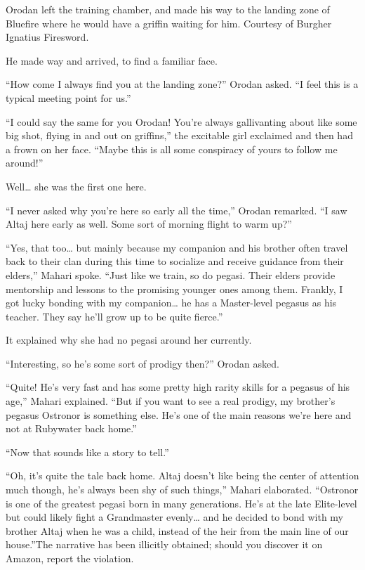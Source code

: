 \documentclass[a4paper,10pt]{book}
\begin{document}
Orodan left the training chamber, and made his way to the landing zone of Bluefire where he would have a griffin waiting for him. Courtesy of Burgher Ignatius Firesword.\par
He made way and arrived, to find a familiar face.\par
“How come I always find you at the landing zone?” Orodan asked. “I feel this is a typical meeting point for us.”\par
“I could say the same for you Orodan! You’re always gallivanting about like some big shot, flying in and out on griffins,” the excitable girl exclaimed and then had a frown on her face. “Maybe this is all some conspiracy of yours to follow me around!”\par
Well… she was the first one here.\par
“I never asked why you’re here so early all the time,” Orodan remarked. “I saw Altaj here early as well. Some sort of morning flight to warm up?”\par
“Yes, that too… but mainly because my companion and his brother often travel back to their clan during this time to socialize and receive guidance from their elders,” Mahari spoke. “Just like we train, so do pegasi. Their elders provide mentorship and lessons to the promising younger ones among them. Frankly, I got lucky bonding with my companion… he has a Master-level pegasus as his teacher. They say he’ll grow up to be quite fierce.”\par
It explained why she had no pegasi around her currently.\par
“Interesting, so he’s some sort of prodigy then?” Orodan asked.\par
“Quite! He’s very fast and has some pretty high rarity skills for a pegasus of his age,” Mahari explained. “But if you want to see a real prodigy, my brother’s pegasus Ostronor is something else. He’s one of the main reasons we’re here and not at Rubywater back home.”\par
“Now that sounds like a story to tell.”\par
“Oh, it’s quite the tale back home. Altaj doesn’t like being the center of attention much though, he’s always been shy of such things,” Mahari elaborated. “Ostronor is one of the greatest pegasi born in many generations. He’s at the late Elite-level but could likely fight a Grandmaster evenly… and he decided to bond with my brother Altaj when he was a child, instead of the heir from the main line of our house.”The narrative has been illicitly obtained; should you discover it on Amazon, report the violation.\par
\end{document}
